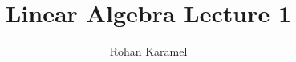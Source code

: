 \documentclass[12pt,reqno]{amsart}
\title{Linear Algebra Lecture 1}
\author{Rohan Karamel}
\theoremstyle{plain}
\begin{document}
    \begin{abstract}
        
    \end{abstract}

    \maketitle
\end{document}
